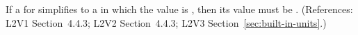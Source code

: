 If a \UnitDefinition for  simplifies to a \Unit in which the
  value is , then its
  value must be . (References:
L2V1 Section~4.4.3; L2V2 Section~4.4.3; L2V3 Section~\ref{sec:built-in-units}.)
